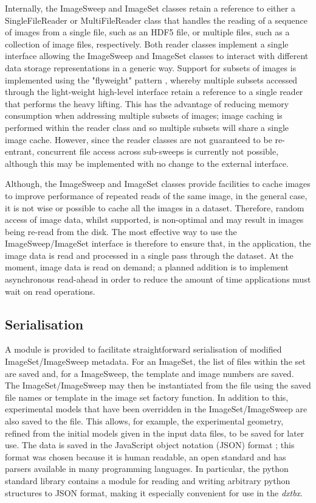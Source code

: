 \documentclass[preprint]{iucr}
\newcommand{\dxtbx}{\emph{dxtbx}\xspace}
\begin{document}
Internally, the ImageSweep and ImageSet classes retain a reference to either a 
SingleFileReader or MultiFileReader class that handles the reading of a sequence 
of images from a single file, such as an HDF5 \cite{TheHDFGroup2010} file, or 
multiple files, such as a collection of image files, respectively. Both reader 
classes implement a single interface allowing the ImageSweep and ImageSet 
classes to interact with different data storage representations in a generic 
way. Support for subsets of images is implemented using the "flyweight" pattern 
\cite{Gamma1994}, whereby multiple subsets accessed through the light-weight 
high-level interface retain a reference to a single reader that performs the 
heavy lifting. This has the advantage of reducing memory consumption when 
addressing multiple subsets of images; image caching is performed within the 
reader class and so multiple subsets will share a single image cache. However, 
since the reader classes are not guaranteed to be re-entrant, concurrent file 
access across sub-sweeps is currently not possible, although this may be 
implemented with no change to the external interface.

Although, the ImageSweep and ImageSet classes provide facilities to cache images 
to improve performance of repeated reads of the same image, in the general case, 
it is not wise or possible to cache all the images in a dataset. Therefore, 
random access of image data, whilst supported, is non-optimal and may result in 
images being re-read from the disk. The most effective way to use the 
ImageSweep/ImageSet interface is therefore to ensure that, in the application, 
the image data is read and processed in a single pass through the dataset. 
At the moment, image data is read on demand; a planned addition is to implement 
asynchronous read-ahead in order to reduce the amount of time applications 
must wait on read operations.

\subsection{Serialisation}

A module is provided to facilitate straightforward serialisation of modified 
ImageSet/ImageSweep metadata. For an ImageSet, the list of files within the set 
are saved and, for a ImageSweep, the template and image numbers are saved. The 
ImageSet/ImageSweep may then be instantiated from the file using the saved file 
names or template in the image set factory function. In addition to this, 
experimental models that have been overridden in the ImageSet/ImageSweep are 
also saved to the file. This allows, for example, the experimental geometry, 
refined from the initial models given in the input data files, to be saved for 
later use. The data is saved in the JavaScript object notation (JSON) format 
\cite{Crockford2006}; this format was chosen because it is human readable, an open 
standard and has parsers available in many programming languages. In particular, 
the python standard library contains a module for reading and writing arbitrary 
python structures to JSON format, making it especially convenient for use in 
the \dxtbx.
\end{document}
